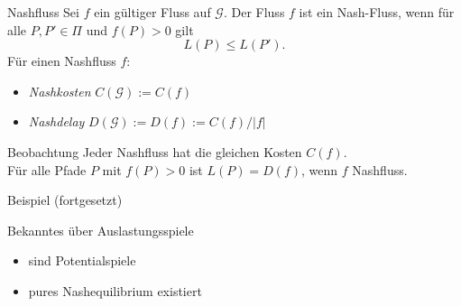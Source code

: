 \documentclass{beamer}
\begin{document}
\begin{frame}{Nashfluss}
	Sei $f$ ein gültiger Fluss auf $\mathcal G$. 
	Der Fluss $f$ ist ein \alert{Nash-Fluss}, wenn für alle $P, P' \in \Pi$ und $f(P) > 0$ gilt
	\[
		L(P) \leq L(P').
	\]
	Für einen Nashfluss $f$:
	\begin{itemize}
		\item \emph{Nashkosten} $C(\mathcal G) := C(f)$
		\item \emph{Nashdelay} $D(\mathcal G) := D(f) := C(f)/|f|$
	\end{itemize}
	
	\begin{block}{Beobachtung}
		Jeder Nashfluss hat die gleichen Kosten $C(f)$. \\
		Für alle Pfade $P$ mit $f(P) > 0$ ist $L(P) = D(f)$, wenn $f$ Nashfluss.
	\end{block}
\end{frame}

\begin{frame}{Beispiel (fortgesetzt)}
\end{frame}

\begin{frame}{Bekanntes über Auslastungsspiele}
	\begin{itemize}
		\item sind Potentialspiele
		\item pures Nashequilibrium existiert
	\end{itemize}
\end{frame}
\end{document}
